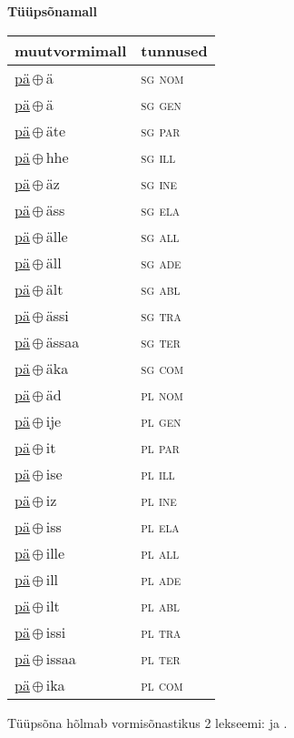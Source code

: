 

\vspace{3.5em}
\noindent \begin{minipage}{\textwidth}
\noindent \textbf{Tüüpsõnamall \,}\\

\begin{sideways}
\begin{tabular}{l l}
muutvormimall & tunnused \\
\hline
\underline{pä}\,$\oplus$\,ä & \textsc{ sg nom } \\
\underline{pä}\,$\oplus$\,ä & \textsc{ sg gen } \\
\underline{pä}\,$\oplus$\,äte & \textsc{ sg par } \\
\underline{pä}\,$\oplus$\,hhe & \textsc{ sg ill } \\
\underline{pä}\,$\oplus$\,äz & \textsc{ sg ine } \\
\underline{pä}\,$\oplus$\,äss & \textsc{ sg ela } \\
\underline{pä}\,$\oplus$\,älle & \textsc{ sg all } \\
\underline{pä}\,$\oplus$\,äll & \textsc{ sg ade } \\
\underline{pä}\,$\oplus$\,ält & \textsc{ sg abl } \\
\underline{pä}\,$\oplus$\,ässi & \textsc{ sg tra } \\
\underline{pä}\,$\oplus$\,ässaa & \textsc{ sg ter } \\
\underline{pä}\,$\oplus$\,äka & \textsc{ sg com } \\
\underline{pä}\,$\oplus$\,äd & \textsc{ pl nom } \\
\underline{pä}\,$\oplus$\,ije & \textsc{ pl gen } \\
\underline{pä}\,$\oplus$\,it & \textsc{ pl par } \\
\underline{pä}\,$\oplus$\,ise & \textsc{ pl ill } \\
\underline{pä}\,$\oplus$\,iz & \textsc{ pl ine } \\
\underline{pä}\,$\oplus$\,iss & \textsc{ pl ela } \\
\underline{pä}\,$\oplus$\,ille & \textsc{ pl all } \\
\underline{pä}\,$\oplus$\,ill & \textsc{ pl ade } \\
\underline{pä}\,$\oplus$\,ilt & \textsc{ pl abl } \\
\underline{pä}\,$\oplus$\,issi & \textsc{ pl tra } \\
\underline{pä}\,$\oplus$\,issaa & \textsc{ pl ter } \\
\underline{pä}\,$\oplus$\,ika & \textsc{ pl com } \\
\end{tabular}
\end{sideways}
\label{tab:tüüpsõnamall-pää}

\end{minipage}

 
\vspace{1em}
\noindent Tüüpsõna hõlmab vormisõnastikus 2 lekseemi:  ja .
